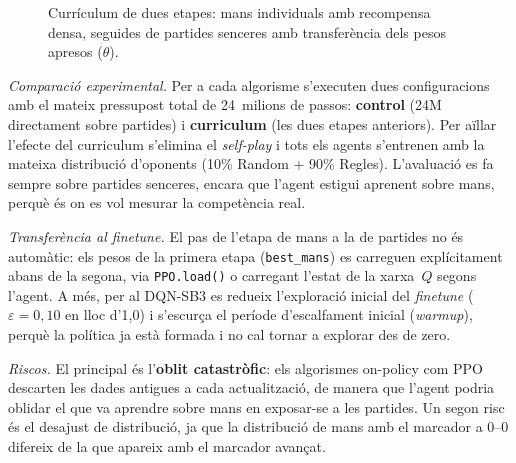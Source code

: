 \begin{figure}[H]
  \centering
  \caption[Currículum de dues etapes (Fase~2).]{Currículum de dues etapes: mans individuals amb recompensa densa, seguides de
           partides senceres amb transferència dels pesos apresos ($\theta$).}
  \label{fig:fase2-curriculum}
\end{figure}

\emph{Comparació experimental.} Per a cada algorisme s'executen dues configuracions amb el
mateix pressupost total de 24~milions de passos: \textbf{control} (24M directament sobre
partides) i \textbf{curriculum} (les dues etapes anteriors). Per aïllar l'efecte del
curriculum s'elimina el \emph{self-play} i tots els agents s'entrenen amb la mateixa
distribució d'oponents (10\% Random + 90\% Regles). L'avaluació es fa sempre sobre partides
senceres, encara que l'agent estigui aprenent sobre mans, perquè és on es vol mesurar la
competència real.

\emph{Transferència al finetune.} El pas de l'etapa de mans a la de partides no és
automàtic: els pesos de la primera etapa (\texttt{best\_mans}) es carreguen explícitament
abans de la segona, via \texttt{PPO.load()} o carregant l'estat de la xarxa~$Q$ segons
l'agent. A més, per al DQN-SB3 es redueix l'exploració inicial del \emph{finetune}
($\varepsilon = 0{,}10$ en lloc d'1{,}0) i s'escurça el període d'escalfament inicial
(\emph{warmup}), perquè la política ja
està formada i no cal tornar a explorar des de zero.

\emph{Riscos.} El principal és l'\textbf{oblit catastròfic}: els algorismes on-policy com
PPO descarten les dades antigues a cada actualització, de manera que l'agent podria oblidar
el que va aprendre sobre mans en exposar-se a les partides. Un segon risc és el desajust de
distribució, ja que la distribució de mans amb el marcador a 0--0 difereix de la que
apareix amb el marcador avançat.

